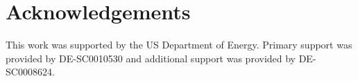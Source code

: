 \section*{Acknowledgements}
This work was supported by the US Department of Energy. Primary
support was provided by DE-SC0010530 and additional support
was provided by DE-SC0008624.
